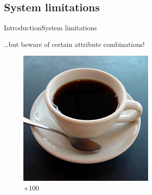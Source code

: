 \subsection{System limitations}
\begin{frame}{Introduction}{System limitations}

\ldots{}but beware of certain attribute combinations!
\vfill

\begin{figure}[ht]
\begin{minipage}[b]{0.26\linewidth}
\centering
\includegraphics[width=\textwidth]{img/introduction/coffee.png}
\\{\color{green}+100}
\end{minipage}
\hfill
\begin{minipage}[b]{0.26\linewidth}
\centering

\end{minipage}
\end{figure}
\end{frame}
